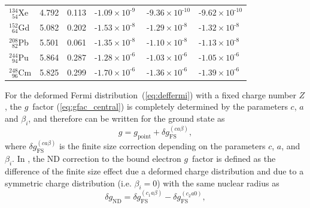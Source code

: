 \begin{table}[b]
\begin{tabular}{lccccc}
$^{134}_{\phantom{0}54}$Xe           & 4.792 & 0.113 & ${\text{-}}{1.09}{\scriptstyle\times}{10^{\text{-}9\phantom{0}}}$ &${\text{-}}{9.36}{\scriptstyle\times}{10^{\text{-}10}}$&${\text{-}}{9.62}{\scriptstyle\times}{10^{\text{-}10}}$\\[4pt]
$^{152}_{\phantom{0}64}$Gd           & 5.082 & 0.202 & ${\text{-}}{1.53}{\scriptstyle\times}{10^{\text{-}8\phantom{0}}}$ &${\text{-}}{1.29}{\scriptstyle\times}{10^{\text{-}8\phantom{0}}}$&${\text{-}}{1.32}{\scriptstyle\times}{10^{\text{-}8\phantom{0}}}$\\[4pt]
$^{208}_{\phantom{0}82}$Pb           & 5.501 & 0.061 & ${\text{-}}{1.35}{\scriptstyle\times}{10^{\text{-}8\phantom{0}}}$ &${\text{-}}{1.10}{\scriptstyle\times}{10^{\text{-}8\phantom{0}}}$&${\text{-}}{1.13}{\scriptstyle\times}{10^{\text{-}8\phantom{0}}}$\\[4pt]
$^{244}_{\phantom{0}94}$Pu           & 5.864 & 0.287 & ${\text{-}}{1.28}{\scriptstyle\times}{10^{\text{-}6\phantom{0}}}$ &${\text{-}}{1.03}{\scriptstyle\times}{10^{\text{-}6\phantom{0}}}$&${\text{-}}{1.05}{\scriptstyle\times}{10^{\text{-}6\phantom{0}}}$\\[4pt]
$^{248}_{\phantom{0}96}$Cm           & 5.825 & 0.299 & ${\text{-}}{1.70}{\scriptstyle\times}{10^{\text{-}6\phantom{0}}}$ &${\text{-}}{1.36}{\scriptstyle\times}{10^{\text{-}6\phantom{0}}}$&${\text{-}}{1.39}{\scriptstyle\times}{10^{\text{-}6\phantom{0}}}$\\[4pt]
\end{tabular}
\end{table}
%
For the deformed Fermi distribution~(\ref{eq:deffermi}) with a fixed charge number $Z$, the $g$~factor (\ref{eq:gfac_central}) is completely determined by the parameters $c$, $a$ and $\beta_i$, and therefore can be written for the ground state as
\begin{equation}
g = g_{\text{point}} + \delta g^{(ca\beta)}_{\text{FS}},
\label{eq:finiteDef}
\end{equation}
where $\delta g^{(ca\beta)}_{\text{FS}}$ is the finite size correction depending on the parameters $c$, $a$, and $\beta_i$. In \cite{jacek2012}, the ND correction to the bound electron $g$~factor is defined as the difference of the finite size effect due a deformed charge distribution and due to a symmetric charge distribution (i.e. ${\beta_i}{=}{0}$) with the same nuclear radius as
\begin{equation}
\delta g_{\text{ND}}=\delta g^{(c_1a\beta)}_{\text{FS}} - \delta g^{(c_2a0)}_{\text{FS}},
\label{eq:defdgnd}
\end{equation}
